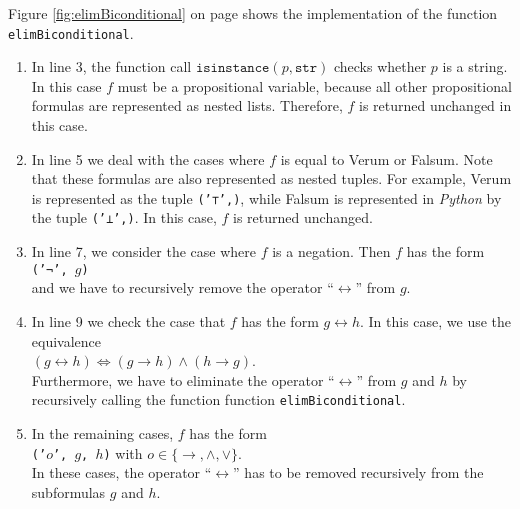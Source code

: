 Figure \ref{fig:elimBiconditional} on page \pageref{fig:elimBiconditional} shows the implementation of the
function \texttt{elimBiconditional}.
\begin{enumerate}
\item In line 3, the function call $\texttt{isinstance}(p, \mathtt{str})$ checks whether $p$ is a string.  In this case
      $f$ must be a propositional variable, because all other propositional formulas are represented as nested lists.
      Therefore, $f$ is returned unchanged in this case.
\item In line 5 we deal with the cases where $f$ is equal to Verum or Falsum.
      Note that these formulas are also represented as nested tuples.
      For example, Verum is represented as the tuple \texttt{('⊤',)}, while Falsum is represented in
      \textsl{Python} by the tuple \texttt{('⊥',)}.  In this case, $f$
      is returned unchanged.
\item In line 7, we consider the case where $f$ is a negation.  Then $f$ has the form
      \\[0.2cm]
      \hspace*{1.3cm}
      \texttt{('¬', $g$)}  
      \\[0.2cm]
      and we have to recursively remove the operator ``$\leftrightarrow$'' from $g$.
\item In line 9 we check the case that $f$ has the form $g \leftrightarrow h$.
      In this case, we use the equivalence
      \\[0.2cm]
      \hspace*{1.3cm}
      $(g \leftrightarrow h) \Leftrightarrow (g \rightarrow h) \wedge (h \rightarrow g)$.
      \\[0.2cm]
      Furthermore, we have to eliminate the operator ``$\leftrightarrow$'' from $g$ and $h$ by recursively
      calling the function function \texttt{elimBiconditional}.
\item In the remaining cases, $f$ has the form
      \\[0.2cm]
      \hspace*{1.3cm}
      \texttt{('$o$', $g$, $h$)}  \quad with $o \in \{\rightarrow, \wedge, \vee\}$.
      \\[0.2cm]
      In these cases, the operator ``$\leftrightarrow$'' has to be removed recursively from the subformulas $g$ and $h$. 
\end{enumerate}
\FloatBarrier

